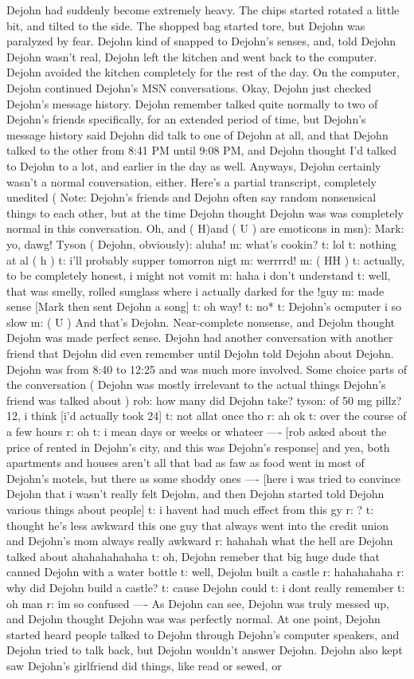 \documentclass[12pt]{book}
\begin{document}
Dejohn had suddenly become extremely heavy. The chips started rotated a little bit, and tilted to the side. The shopped bag started tore, but Dejohn was paralyzed by fear. Dejohn kind of snapped to Dejohn's senses, and, told Dejohn Dejohn wasn't real, Dejohn left the kitchen and went back to the computer. Dejohn avoided the kitchen completely for the rest of the day. On the computer, Dejohn continued Dejohn's MSN conversations. Okay, Dejohn just checked Dejohn's message history. Dejohn remember talked quite normally to two of Dejohn's friends specifically, for an extended period of time, but Dejohn's message history said Dejohn did talk to one of Dejohn at all, and that Dejohn talked to the other from 8:41 PM until 9:08 PM, and Dejohn thought I'd talked to Dejohn to a lot, and earlier in the day as well. Anyways, Dejohn certainly wasn't a normal conversation, either. Here's a partial transcript, completely unedited ( Note: Dejohn's friends and Dejohn often say random nonsensical things to each other, but at the time Dejohn thought Dejohn was was completely normal in this conversation. Oh, and ( H)and ( U ) are emoticons in msn): Mark: yo, dawg! Tyson ( Dejohn, obviously): aluha! m: what's cookin? t: lol t: nothing at al ( h ) t: i'll probably supper tomorron nigt m: werrrrd! m: ( HH ) t: actually, to be completely honest, i might not vomit m: haha i don't understand t: well, that was smelly, rolled sunglass where i actually darked for the !guy m: made sense [Mark then sent Dejohn a song] t: oh way! t: no* t: Dejohn's ocmputer i so slow m: ( U ) And that's Dejohn. Near-complete nonsense, and Dejohn thought Dejohn was made perfect sense. Dejohn had another conversation with another friend that Dejohn did even remember until Dejohn told Dejohn about Dejohn. Dejohn was from 8:40 to 12:25 and was much more involved. Some choice parts of the conversation ( Dejohn was mostly irrelevant to the actual things Dejohn's friend was talked about ) rob: how many did Dejohn take? tyson: of 50 mg pillz? 12, i think [i'd actually took 24] t: not allat once tho r: ah ok t: over the course of a few hours r: oh t: i mean days or weeks or whateer ---- [rob asked about the price of rented in Dejohn's city, and this was Dejohn's response] and yea, both apartments and houses aren't all that bad as faw as food went in most of Dejohn's motels, but there as some shoddy ones ---- [here i was tried to convince Dejohn that i wasn't really felt Dejohn, and then Dejohn started told Dejohn various things about people] t: i havent had much effect from this gy r: ? t: thought he's less awkward this one guy that always went into the credit union and Dejohn's mom always really awkward r: hahahah what the hell are Dejohn talked about ahahahahahaha t: oh, Dejohn remeber that big huge dude that canned Dejohn with a water bottle t: well, Dejohn built a castle r: hahahahaha r: why did Dejohn build a castle? t: cause Dejohn could t: i dont really remember t: oh man r: im so confused ---- As Dejohn can see, Dejohn was truly messed up, and Dejohn thought Dejohn was was perfectly normal. At one point, Dejohn started heard people talked to Dejohn through Dejohn's computer speakers, and Dejohn tried to talk back, but Dejohn wouldn't answer Dejohn. Dejohn also kept saw Dejohn's girlfriend did things, like read or sewed, or 
\end{document}
